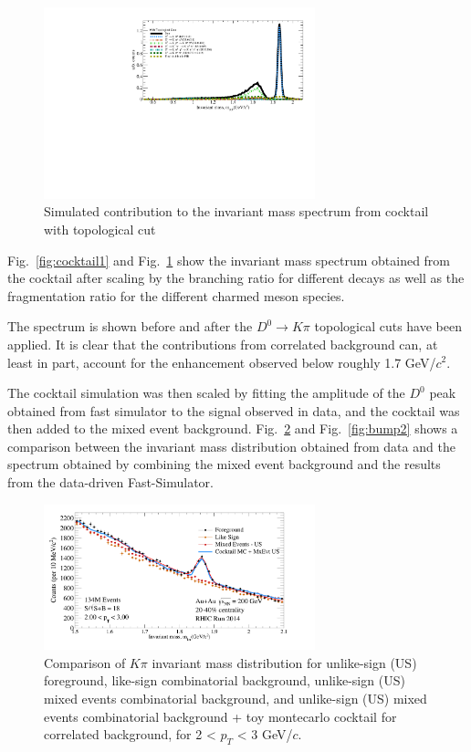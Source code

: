 \begin{figure}[htbp]
\centering
\includegraphics[keepaspectratio,width=0.7\textwidth,angle=0]{figure/Run14_D0HFT/D0Bump_with_topo.pdf}
\caption{Simulated contribution to the invariant mass spectrum from cocktail with topological cut}
\label{fig:cocktail2}
\end{figure}

Fig.~\ref{fig:cocktail1} and Fig.~\ref{fig:cocktail2} show the invariant mass spectrum obtained from the cocktail after scaling by the branching ratio for different decays as well as the fragmentation ratio for the different charmed meson species.

The spectrum is shown before and after the $D^0\rightarrow K\pi$ topological cuts have been applied. It is clear that the contributions from correlated background can, at least in part, account for the enhancement observed below roughly 1.7 GeV/$c^2$.

The cocktail simulation was then scaled by fitting the amplitude of the $D^0$ peak obtained from fast simulator to the signal observed in data, and the cocktail was then added to the mixed event background. Fig.~\ref{fig:bump1} and Fig.~\ref{fig:bump2} shows a comparison between the invariant mass distribution obtained from data and the spectrum obtained by combining the mixed event background and the results from the data-driven Fast-Simulator.

\begin{figure}[htbp]
\centering
\includegraphics[keepaspectratio,width=0.7\textwidth]{figure/Run14_D0HFT/D0_FG_EvMxBg_coktail_2040_2_pT_3.png}
\caption{Comparison of $K\pi$ invariant mass distribution for unlike-sign (US) foreground, like-sign combinatorial background, unlike-sign (US) mixed events combinatorial background, and unlike-sign (US) mixed events combinatorial background + toy montecarlo cocktail for correlated background, for 2 < $p_T$ < 3 GeV/$c$.}
\label{fig:bump1}
\end{figure}

